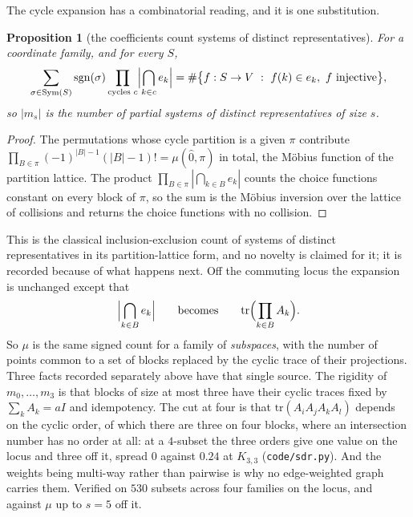 \documentclass[11pt]{article}
\newtheorem{proposition}[theorem]{Proposition}
\theoremstyle{remark}
\begin{document}
The cycle expansion has a combinatorial reading, and it is one substitution.

\begin{proposition}[the coefficients count systems of distinct representatives]\label{prop:sdr}
For a coordinate family, and for every $S$,
\[
\sum_{\sigma\in\mathrm{Sym}(S)}\mathrm{sgn}(\sigma)\prod_{\text{cycles }c}\Bigl|\bigcap_{k\in c}e_k\Bigr|
=\#\bigl\{f:S\to V \ :\ f(k)\in e_k,\ f\text{ injective}\bigr\},
\]
so $|m_s|$ is the number of partial systems of distinct representatives of size $s$.
\end{proposition}

\begin{proof}
The permutations whose cycle partition is a given $\pi$ contribute
$\prod_{B\in\pi}(-1)^{|B|-1}(|B|-1)!=\mu(\hat0,\pi)$ in total, the M\"obius function of the
partition lattice. The product $\prod_{B\in\pi}|\bigcap_{k\in B}e_k|$ counts the choice functions
constant on every block of $\pi$, so the sum is the M\"obius inversion over the lattice of collisions
and returns the choice functions with no collision.
\end{proof}

This is the classical inclusion-exclusion count of systems of distinct representatives in its
partition-lattice form, and no novelty is claimed for it; it is recorded because of what happens
next. Off the commuting locus the expansion is unchanged except that
\[
\Bigl|\bigcap_{k\in B}e_k\Bigr|\qquad\text{becomes}\qquad \mathrm{tr}\Bigl(\prod_{k\in B}A_k\Bigr).
\]
So $\mu$ is the same signed count for a family of \emph{subspaces}, with the number of points common
to a set of blocks replaced by the cyclic trace of their projections. Three facts recorded separately
above have that single source. The rigidity of $m_0,\dots,m_3$ is that blocks of size at most three
have their cyclic traces fixed by $\sum_kA_k=aI$ and idempotency. The cut at four is that
$\mathrm{tr}(A_iA_jA_kA_l)$ depends on the cyclic order, of which there are three on four blocks,
where an intersection number has no order at all: at a $4$-subset the three orders give one value on
the locus and three off it, spread $0$ against $0.24$ at $K_{3,3}$
(\texttt{code/sdr.py}). And the weights being multi-way rather than pairwise is why no edge-weighted
graph carries them. Verified on $530$ subsets across four families on the locus, and against $\mu$ up
to $s=5$ off it.
\end{document}
